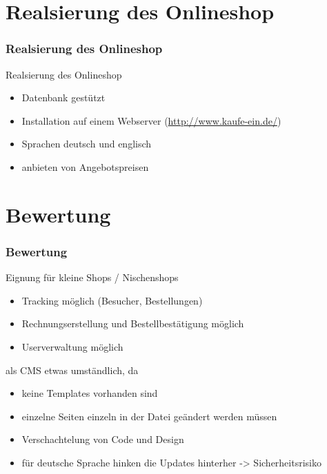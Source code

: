 \documentclass[xcolor=dvipsnames]{beamer}
\begin{document}
\section{Realsierung des Onlineshop}
\begin{frame} %
  \frametitle{Realsierung des Onlineshop} %
  \begin{block}{Realsierung des Onlineshop}
	  \begin{itemize}
		\item Datenbank gestützt
		\item Installation auf einem Webserver (\url{http://www.kaufe-ein.de/})
		\item Sprachen deutsch und englisch
		\item anbieten von Angebotspreisen
	  \end{itemize}
  \end{block}
\end{frame}

\section{Bewertung}
\begin{frame} %
  \frametitle{Bewertung} %
  \begin{block}{Eignung für kleine Shops / Nischenshops }
	  \begin{itemize}
		\item Tracking möglich (Besucher, Bestellungen)
		\item Rechnungserstellung und Bestellbestätigung möglich
		\item Userverwaltung möglich
	  \end{itemize}
  \end{block}
  \begin{alertblock}{als CMS etwas umständlich, da }
	  \begin{itemize}
		\item keine Templates vorhanden sind 
		\item einzelne Seiten einzeln in der Datei geändert werden müssen
		\item Verschachtelung von Code und Design
		\item für deutsche Sprache hinken die Updates hinterher -> Sicherheitsrisiko
	  \end{itemize}
  \end{alertblock}
\end{frame}
\end{document}
